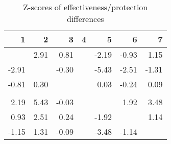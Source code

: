 \begin{table}[ht]
\centering
\begin{tabular}{rrrrrrr}
  \hline
1 & 2 & 3 & 4 & 5 & 6 & 7 \\ 
  \hline
 & 2.91 & 0.81 &  & -2.19 & -0.93 & 1.15 \\ 
  -2.91 &  & -0.30 &  & -5.43 & -2.51 & -1.31 \\ 
  -0.81 & 0.30 &  &  & 0.03 & -0.24 & 0.09 \\ 
   &  &  &  &  &  &  \\ 
  2.19 & 5.43 & -0.03 &  &  & 1.92 & 3.48 \\ 
  0.93 & 2.51 & 0.24 &  & -1.92 &  & 1.14 \\ 
  -1.15 & 1.31 & -0.09 &  & -3.48 & -1.14 &  \\ 
   \hline
\end{tabular}
\caption{Z-scores of effectiveness/protection differences} 
\end{table}
